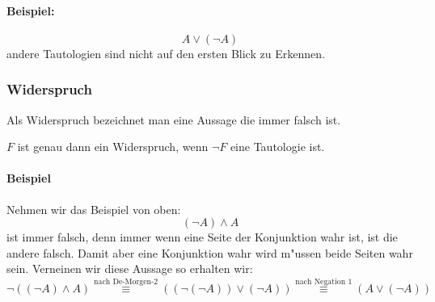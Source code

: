 \paragraph*{Beispiel:}
\begin{equation*}
A \lor (\neg A)
\end{equation*}
andere Tautologien sind nicht auf den ersten Blick zu Erkennen.

\subsubsection{Widerspruch}
Als Widerspruch bezeichnet man eine Aussage die immer falsch ist. 
\begin{axiom}[Widerspruch]
$F$ ist genau dann ein Widerspruch, wenn $\neg F$ eine Tautologie ist.
\end{axiom}

\paragraph*{Beispiel}
Nehmen wir das Beispiel von oben:
\begin{equation*}
(\neg A) \land A
\end{equation*}
ist immer falsch, denn immer wenn eine Seite der Konjunktion wahr ist, ist die andere falsch. Damit aber eine Konjunktion wahr wird m"ussen beide Seiten wahr sein. Verneinen wir diese Aussage so erhalten wir:
\begin{equation*}
\neg ((\neg A) \land A) \stackrel{\text{nach De-Morgen-2}}{\equiv} ((\neg (\neg A)) \lor (\neg A)) \stackrel{\text{nach Negation 1}}{\equiv} (A \lor (\neg A))
\end{equation*} 

